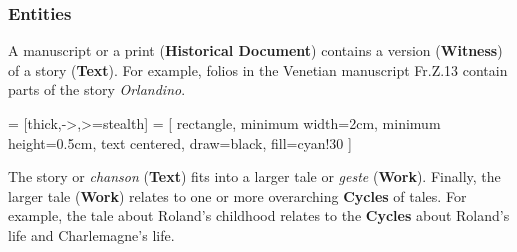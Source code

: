 \begin{frame}
    \frametitle{Entities}
    
    A manuscript or a print (\textbf{Historical Document}) contains a version (\textbf{Witness}) of a story (\textbf{Text}).
    For example, folios in the Venetian manuscript Fr.Z.13 contain parts of the story \textit{Orlandino}.
    
    \tiny
    
     = [thick,->,>=stealth]
     = [
        rectangle,
        minimum width=2cm,
        minimum height=0.5cm,
        text centered,
        draw=black,
        fill=cyan!30
    ]
    
    \begin{center}
    \end{center}
    
    \normalsize
    
    The story or \textit{chanson} (\textbf{Text}) fits into a larger tale or \textit{geste} (\textbf{Work}).
    Finally, the larger tale (\textbf{Work}) relates to one or more overarching \textbf{Cycles} of tales.
    For example, the tale about Roland's childhood relates to the \textbf{Cycles} about Roland's life
    and Charlemagne's life.
        
    \end{frame}
    
